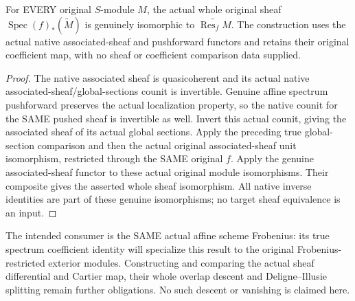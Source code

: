 \begin{theorem}
\label{thm:cartier-spec-pushforward-tilde}
\leanok
For EVERY original $S$-module $M$, the actual whole original sheaf
$\operatorname{Spec}(f)_*(\widetilde M)$ is genuinely isomorphic to
$\widetilde{\operatorname{Res}_f M}$. The construction uses the actual
native associated-sheaf and pushforward functors and retains their
original coefficient map, with no sheaf or coefficient comparison
data supplied.
\end{theorem}
\begin{proof}
The native associated sheaf is quasicoherent and its actual native
associated-sheaf/global-sections counit is invertible. Genuine affine
spectrum pushforward preserves the actual localization property,
so the native counit for the SAME pushed sheaf is invertible as
well. Invert this actual counit, giving the associated sheaf of its
actual global sections. Apply the preceding true global-section
comparison and then the actual original associated-sheaf unit
isomorphism, restricted through the SAME original $f$. Apply the
genuine associated-sheaf functor to these actual original module
isomorphisms. Their composite gives the asserted whole sheaf
isomorphism. All native inverse identities are part of these genuine
isomorphisms; no target sheaf equivalence is an input.
\end{proof}

The intended consumer is the SAME actual affine scheme Frobenius:
its true spectrum coefficient identity will specialize this result
to the original Frobenius-restricted exterior modules. Constructing
and comparing the actual sheaf differential and Cartier map, their
whole overlap descent and Deligne--Illusie splitting remain further
obligations. No such descent or vanishing is claimed here.
